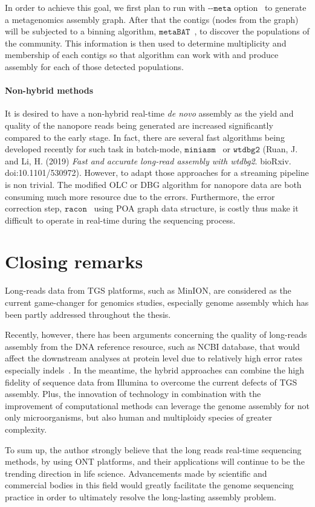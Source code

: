 In order to achieve this goal, we first plan to run \spades{} with -{}-$\mathtt{meta}$ option~\cite{Nurk2017metaspades} to generate a metagenomics assembly graph. After that the contigs (nodes from the graph) will be subjected to a binning algorithm, \EG{} $\mathtt{metaBAT}$~\cite{Kang2015metabat}, to discover the populations of the community.
This information is then used to determine multiplicity and membership of each contigs so that \npgraph{} algorithm can work with and produce assembly for each of those detected populations.

\paragraph{Non-hybrid methods}
It is desired to have a non-hybrid real-time \emph{de novo} assembly as the yield and quality of the nanopore reads being generated are increased significantly compared to the early stage. 
In fact, there are several fast algorithms being developed recently for such task in batch-mode, \IE{} $\mathtt{miniasm}$~\cite{Li2016} or $\mathtt{wtdbg2}$ (Ruan, J. and Li, H. (2019) \emph{Fast and accurate long-read assembly with wtdbg2}. bioRxiv. doi:10.1101/530972).
However, to adapt those approaches for a streaming pipeline is non trivial.
The modified OLC or DBG algorithm for nanopore data are both consuming much more resource due to the errors.
Furthermore, the error correction step, \EG{} $\mathtt{racon}$~\cite{Vaser2017racon} using POA graph data structure, is costly thus make it difficult to operate in real-time during the sequencing process.
\section{Closing remarks}
Long-reads data from TGS platforms, such as MinION, are considered as the  current game-changer for genomics studies, especially genome assembly which has been partly addressed throughout the thesis.

Recently, however, there has been arguments concerning the quality of long-reads assembly from the DNA reference resource, such as NCBI database, that would affect the downstream analyses at protein level due to relatively high error rates especially indels~\cite{Watson2019errors,Koren2019reply}.
In the meantime, the hybrid approaches can combine the high fidelity of sequence data from Illumina to overcome the current defects of TGS assembly.
Plus, the innovation of technology in combination with the improvement of computational methods can leverage the genome assembly for not only microorganisms, but also human and multiploidy species of greater complexity.

To sum up, the author strongly believe that the long reads real-time sequencing methods, \EG by using ONT platforms, and their applications  will continue to be the trending direction in life science. 
Advancements made by scientific and commercial bodies in this field would greatly facilitate the genome sequencing practice in order to ultimately resolve the long-lasting assembly problem.

